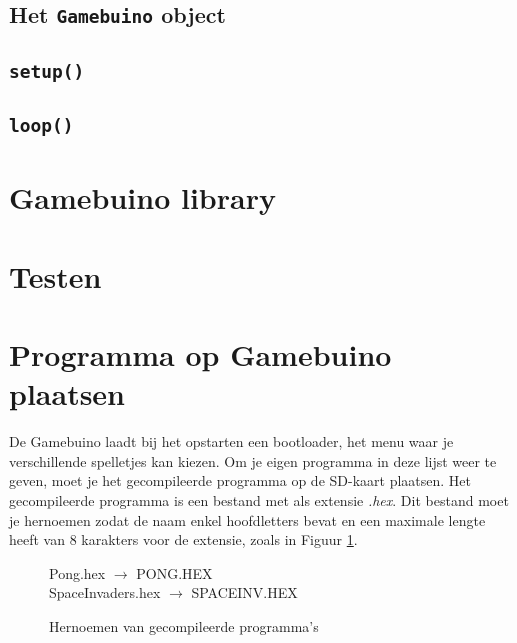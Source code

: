 \documentclass[a4paper,titlepage,12pt]{article}
\begin{document}
	\subsection{Het \texttt{Gamebuino} object}
	
	\subsection{\texttt{setup()}}
	\subsection{\texttt{loop()}}
	
	\section{Gamebuino library}
	
	\section{Testen}
	
	\section{Programma op Gamebuino plaatsen}
	De Gamebuino laadt bij het opstarten een bootloader, het menu waar je verschillende spelletjes kan kiezen. Om je eigen programma in deze lijst weer te geven, moet je het gecompileerde programma op de SD-kaart plaatsen. Het gecompileerde programma is een bestand met als extensie \emph{.hex}. Dit bestand moet je hernoemen zodat de naam enkel hoofdletters bevat en een maximale lengte heeft van 8 karakters voor de extensie, zoals in Figuur \ref{fig:hernoemen}.
	\begin{figure}[h]
		\centering
		Pong.hex \(\longrightarrow\) PONG.HEX \\
		SpaceInvaders.hex \(\longrightarrow\) SPACEINV.HEX
		\caption{\label{fig:hernoemen}Hernoemen van gecompileerde programma's}
	\end{figure}
	
	
\end{document}
